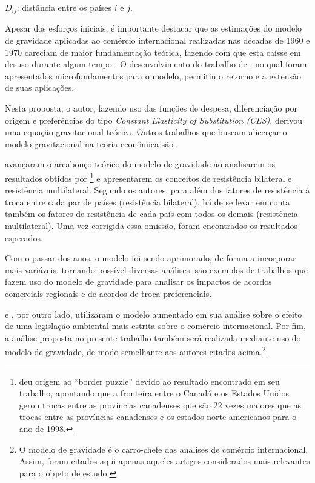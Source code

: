  $D_{ij}$: distância entre os países $i$ e $j$.

Apesar dos esforços iniciais, é importante destacar que as estimações do modelo de gravidade aplicadas ao comércio internacional realizadas nas décadas de 1960 e 1970 careciam de maior fundamentação teórica, fazendo com que esta caísse em desuso durante algum tempo \cite{Baldwin2006}. O desenvolvimento do trabalho de , no qual foram apresentados microfundamentos para o modelo, permitiu o retorno e a extensão de suas aplicações. 

Nesta proposta, o autor, fazendo uso das funções de despesa, diferenciação por origem e preferências do tipo \textit{Constant Elasticity of Substitution (CES)}, derivou uma equação gravitacional teórica. Outros trabalhos que buscam alicerçar o modelo gravitacional na teoria econômica são \cite{Bergstrand1985, Bergstrand1989, Deardorff1998}.

 avançaram o arcabouço teórico do modelo de gravidade ao analisarem os resultados obtidos por \footnote{ deu origem ao “border puzzle” devido ao resultado encontrado em seu trabalho, apontando que a fronteira entre o Canadá e os Estados Unidos gerou trocas entre as províncias canadenses que são 22 vezes maiores que as trocas entre as províncias canadenses e os estados norte americanos para o ano de 1998.}  e apresentarem os conceitos de resistência bilateral e resistência multilateral. Segundo os autores, para além dos fatores de resistência à troca entre cada par de países (resistência bilateral), há de se levar em conta também os fatores de resistência de cada país com todos os demais (resistência multilateral). Uma vez corrigida essa omissão, foram encontrados os resultados esperados.
 
Com o passar dos anos, o modelo foi sendo aprimorado, de forma a incorporar mais variáveis, tornando possível diversas análises.  são exemplos de trabalhos que fazem uso do modelo de gravidade para analisar os impactos de acordos comerciais regionais e de acordos de troca preferenciais. 

 e , por outro lado, utilizaram o modelo aumentado em sua análise sobre o efeito de uma legislação ambiental mais estrita sobre o comércio internacional. Por fim, a análise proposta no presente trabalho também será realizada mediante uso do modelo de gravidade, de modo semelhante aos autores citados acima.\footnote{O modelo de gravidade é o carro-chefe das análises de comércio internacional. Assim, foram citados aqui apenas aqueles artigos considerados mais relevantes para o objeto de estudo.}. 

